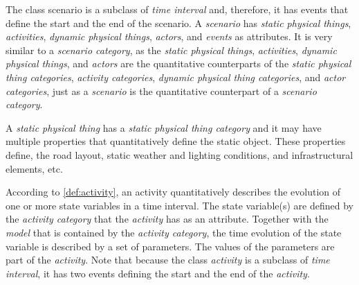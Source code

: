 \cstartb The class scenario is a subclass of \textit{time interval} and, therefore, it has events that define the start and the end of the scenario. \cendb
A \textit{scenario} has \cstartc\textit{static physical things}\cendc, \textit{activities}, \cstartb \textit{dynamic physical things}, \cendb \textit{actors}, and \textit{events} as attributes. 
It is very similar to a \textit{scenario category}, as the \cstartc\textit{static physical things}\cendc, \textit{activities}, \cstartb \textit{dynamic physical things}, \cendb and \textit{actors} are the quantitative counterparts of the \cstartc\textit{static physical thing categories}\cendc, \textit{activity categories}, \cstartb \textit{dynamic physical thing categories}, \cendb and \textit{actor categories}, just as a \textit{scenario} is the quantitative counterpart of a \textit{scenario category}. 

\cstartb A \textit{static physical thing} has a \textit{static physical thing category} and it may have multiple properties that quantitatively define the static object. \cendb These properties define, the road layout, static weather and lighting conditions, and infrastructural elements, etc.

According to \cref{def:activity}, an activity quantitatively describes the evolution of one or more state variables in a time interval. The state variable(s) are defined by the \textit{activity category} that the \textit{activity} has as an attribute. Together with the \textit{model} that is contained by the \textit{activity category}, the time evolution of the state variable is described by a set of parameters. The values of the parameters are part of the \textit{activity}. 
\cstartb Note that because the class \textit{activity} is a subclass of \textit{time interval}, it has two events defining the start and the end of the \textit{activity}. \cendb

